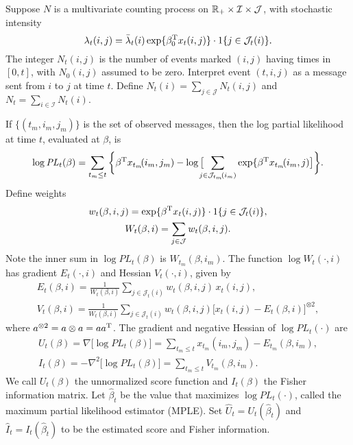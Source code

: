 \documentclass[aoas,preprint]{imsart}
\begin{document}
Suppose $N$ is a multivariate counting process on 
$\mathbb{R}_+ \times \mathcal{I} \times \mathcal{J}$,
with stochastic intensity
\begin{equation}
    \lambda_t(i,j)
        =
        \bar \lambda_t(i)
        \exp\{ \beta_0^\trans x_t(i, j) \}
        \cdot
        1{\{j \in \mathcal{J}_t(i)\}}.
\end{equation}
The integer $N_t(i,j)$ is the number of events marked $(i,j)$ having
times in  $[0,t]$, with $N_0(i,j)$ assumed to be zero.
Interpret event $(t, i, j)$ as a message sent from $i$ to $j$ at
time $t$.  Define
\(
    N_t(i) = \sum_{j \in \mathcal{J}} N_t(i,j)
\)
and
\(
    N_t = \sum_{i \in \mathcal{I}} N_t(i).
\)

  
If $\{ (t_m, i_m, j_m) \}$ is the set of observed messages, then
the log partial likelihood at time $t$, evaluated at $\beta$, is
\begin{equation}
    \log
    \mathit{PL}_t(\beta)
        =
        \sum_{t_m \leq t}
        \bigg\{
            \beta^\trans x_{t_m}\!(i_m, j_m)
            -
            \log\big[
                \!\!\!\!
                \sum_{j \in \mathcal{J}_{t_m}\!(i_m)}
                    \exp\{ \beta^\trans x_{t_m}\!(i_m, j)
            \big]
        \bigg\}.
\end{equation}
Define weights
\begin{gather}
    w_{t}(\beta, i,j)
        =
        \exp\{ \beta^\trans x_t(i,j) \}
        \cdot
        1\{ j \in \mathcal{J}_t(i)\}, \\
    W_{t}(\beta, i)
        =
        \sum_{j \in \mathcal{J}} w_{t}(\beta, i,j).
\end{gather}
Note the inner sum in $\log \mathit{PL}_t(\beta)$ is
$W_{t_m}\!(\beta, i_m)$.  The function 
$\log W_{t}(\cdot, i)$ has gradient $E_{t}(\cdot, i)$ and Hessian 
$V_{t}(\cdot, i)$, given by
\begin{gather}
    E_{t}(\beta, i)
        =
        \frac{1}{W_{t}(\beta, i)}
        \sum_{j \in \mathcal{J}_t(i)}
            w_{t}(\beta, i,j) \, x_{t}(i,j), \\
    V_{t}(\beta, i)
        =
        \frac{1}{W_{t}(\beta, i)}
        \sum_{j \in \mathcal{J}_t(i)}
            w_{t}(\beta, i,j) 
            \Big[ x_{t}(i,j) - E_{t}(\beta, i)\Big]^{\otimes 2},
\end{gather}
where $a^{\otimes 2} = a \otimes a = a a^{\mathrm{T}}$.
The gradient and negative Hessian of $\log \mathit{PL}_t(\cdot)$ are
\begin{gather}
    U_t(\beta)
        =
        \nabla \big[ \log \mathit{PL}_t(\beta) \big]
        =
        \sum_{t_m \leq t}
            x_{t_m}(i_m, j_m) - E_{t_m}(\beta, i_m), \\
    I_t(\beta)
        =
        -\nabla^2 \big[ \log \mathit{PL}_t(\beta) \big]
        =
        \sum_{t_m \leq t}
            V_{t_m}(\beta, i_m).
\end{gather}
We call $U_t(\beta)$ the unnormalized score function and $I_t(\beta)$
the Fisher information matrix.  Let $\hat \beta_t$ be the value that
maximizes $\log \mathit{PL}_t(\cdot)$, called the maximum partial
likelihood estimator (MPLE).  Set $\hat U_t = U_t(\hat \beta_t)$ and
$\hat I_t = I_t(\hat \beta_t)$ to be the estimated score and Fisher
information.
\end{document}
